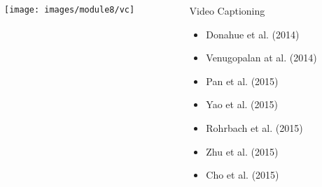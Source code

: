 \begin{frame}
	\begin{columns}
		\begin{column}{0.6\textwidth}
			\vspace{0.2in}
			\begin{overlayarea}{\textwidth}{\textheight}
				\texttt{[image: images/module8/vc]}
			\end{overlayarea}
		\end{column}

		\begin{column}{0.4\textwidth}
			\begin{overlayarea}{\textwidth}{\textheight}

				\begin{block}{Video Captioning
					}
					\begin{itemize}
						\item Donahue et al. (2014) \cite{DBLP:journals/corr/DonahueHGRVSD14}
						\item Venugopalan at al. (2014) \cite{DBLP:conf/naacl/VenugopalanXDRM15}
						\item Pan et al. (2015) \cite{DBLP:journals/corr/PanMYLR15}
						\item Yao et al. (2015) \cite{DBLP:conf/iccv/YaoTCBPLC15}
						\item Rohrbach et al. (2015) \cite{DBLP:conf/dagm/RohrbachRQFPS14}
						\item Zhu et al. (2015) \cite{DBLP:journals/corr/ZhuXYH15}
						\item Cho et al. (2015) \cite{DBLP:conf/emnlp/ChoMGBBSB14}
					\end{itemize}
				\end{block}
			\end{overlayarea}
		\end{column}

	\end{columns}
\end{frame}


